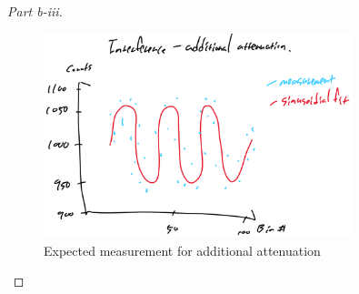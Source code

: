 \documentclass{article}
\numberwithin{equation}{section}
\begin{document}
\begin{proof}
    [Part b-iii] 
    \begin{figure}[htp]
        \centering
        \includegraphics[width=0.8\textwidth]{B_ND.png} %
        \caption{Expected measurement for additional attenuation}
        \label{fig:Battenuated}
    \end{figure}


\end{proof}
\end{document}
